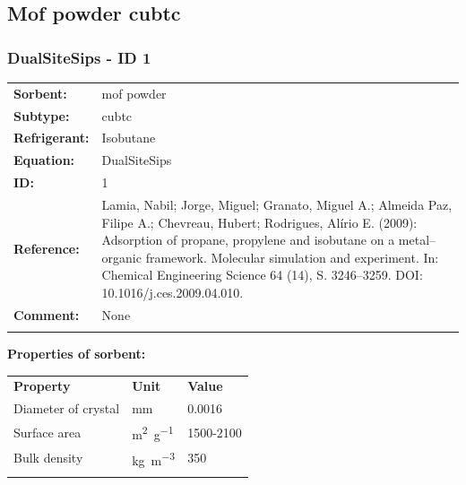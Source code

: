 \subsection{Mof powder cubtc}
%
\subsubsection{DualSiteSips - ID 1}
%
\begin{tabular}[l]{|lp{11.5cm}|}
\hline
\addlinespace

\textbf{Sorbent:} & mof powder \\
\textbf{Subtype:} & cubtc \\
\textbf{Refrigerant:} & Isobutane \\
\textbf{Equation:} & DualSiteSips \\
\textbf{ID:} & 1 \\
\textbf{Reference:} & Lamia, Nabil; Jorge, Miguel; Granato, Miguel A.; Almeida Paz, Filipe A.; Chevreau, Hubert; Rodrigues, Alírio E. (2009): Adsorption of propane, propylene and isobutane on a metal–organic framework. Molecular simulation and experiment. In: Chemical Engineering Science 64 (14), S. 3246–3259. DOI: 10.1016/j.ces.2009.04.010. \\
\textbf{Comment:} & None \\

\addlinespace
\hline
\end{tabular}
\newline

\textbf{Properties of sorbent:}
\newline
%
\begin{longtable}[l]{lll}
\toprule
\addlinespace
\textbf{Property} & \textbf{Unit} & \textbf{Value} \\
\addlinespace
\midrule
\endhead
\bottomrule
\endfoot
\bottomrule
\endlastfoot
\addlinespace

Diameter of crystal & \si{\milli\meter} & 0.0016\\
Surface area & \si{\square\meter\per\gram} & 1500-2100\\
Bulk density & \si{\kilogram\per\cubic\meter} & 350\\

\addlinespace\end{longtable}

